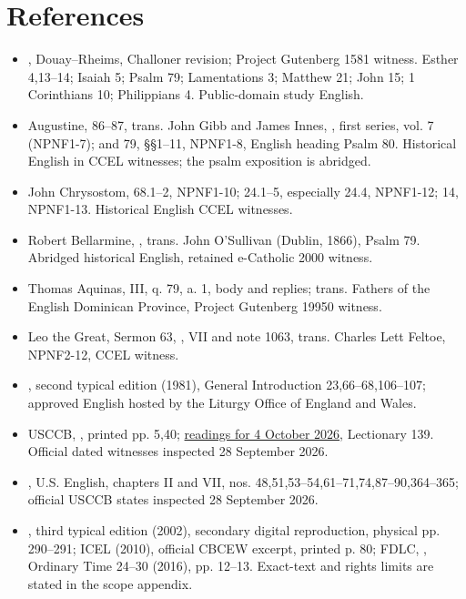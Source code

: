 \section{References}
\begin{itemize}
\item {}, Douay--Rheims, Challoner revision; Project Gutenberg 1581 witness. Esther 4,13--14; Isaiah 5; Psalm 79; Lamentations 3; Matthew 21; John 15; 1 Corinthians 10; Philippians 4. Public-domain study English.
\item Augustine,  86--87, trans. John Gibb and James Innes, , first series, vol. 7 (NPNF1-7); and  79, §§1--11, NPNF1-8, English heading Psalm 80. Historical English in CCEL witnesses; the psalm exposition is abridged.
\item John Chrysostom,  68.1--2, NPNF1-10;  24.1--5, especially 24.4, NPNF1-12;  14, NPNF1-13. Historical English CCEL witnesses.
\item Robert Bellarmine, , trans. John O'Sullivan (Dublin, 1866), Psalm 79. Abridged historical English, retained e-Catholic 2000 witness.
\item Thomas Aquinas,  III, q. 79, a. 1, body and replies; trans. Fathers of the English Dominican Province, Project Gutenberg 19950 witness.
\item Leo the Great, Sermon 63, , VII and note 1063, trans. Charles Lett Feltoe, NPNF2-12, CCEL witness.
\item {}, second typical edition (1981), General Introduction 23,66--68,106--107; approved English hosted by the Liturgy Office of England and Wales.
\item USCCB, , printed pp. 5,40; \href{https://bible.usccb.org/bible/readings/100426.cfm}{readings for 4 October 2026}, Lectionary 139. Official dated witnesses inspected 28 September 2026.
\item {}, U.S. English, chapters II and VII, nos. 48,51,53--54,61--71,74,87--90,364--365; official USCCB states inspected 28 September 2026.
\item {}, third typical edition (2002), secondary digital reproduction, physical pp. 290--291; ICEL  (2010), official CBCEW excerpt, printed p. 80; FDLC, , Ordinary Time 24--30 (2016), pp. 12--13. Exact-text and rights limits are stated in the scope appendix.

\end{itemize}

